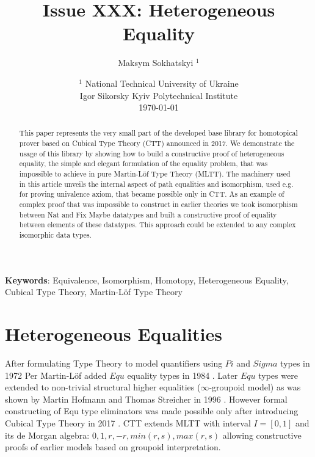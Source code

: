 \documentclass{article}
\begin{document}
\title{Issue XXX: Heterogeneous Equality}
\author{Maksym Sokhatskyi $^1$}
\date{ $^1$ National Technical University of Ukraine \\
       \small Igor Sikorsky Kyiv Polytechnical Institute \\
       \today }

\maketitle

\begin{abstract}
This paper represents the very small part of the developed base library for homotopical
prover based on Cubical Type Theory (CTT) announced in 2017. We demonstrate the usage
of this library by showing how to build a constructive proof of heterogeneous equality,
the simple and elegant formulation of the equality problem, that was impossible to achieve
in pure Martin-Löf Type Theory (MLTT). The machinery used in this article unveils
the internal aspect of path equalities and isomorphism, used e.g. for proving univalence
axiom, that became possible only in CTT. As an example of complex proof that was
impossible to construct in earlier theories we took isomorphism between Nat and Fix Maybe
datatypes and built a constructive proof of equality between elements of these datatypes.
This approach could be extended to any complex isomorphic data types.
\end{abstract}

{\bf Keywords}: Equivalence, Isomorphism, Homotopy,
                Heterogeneous Equality, Cubical Type Theory,
                Martin-Löf Type Theory

\ifincludeTOC
  \tableofcontents
\fi

\newpage

\section{Heterogeneous Equalities}

After formulating Type Theory to model quantifiers using $Pi$ and $Sigma$ types in 1972 \cite{Lof72}
Per Martin-Löf added $Equ$ equality types in 1984 \cite{Lof84}. Later $Equ$ types were extended
to non-trivial structural higher equalities ($\infty$-groupoid model) as was shown by Martin Hofmann
and Thomas Streicher in 1996 \cite{Hofmann96}. However formal constructing of Equ type
eliminators was made possible only after introducing Cubical Type Theory in 2017 \cite{Mortberg17}.
CTT extends MLTT with interval $I=[0,1]$ and its de Morgan algebra: $0, 1, r, -r, min(r,s), max(r,s)$
allowing constructive proofs of earlier models based on groupoid interpretation.
\end{document}
